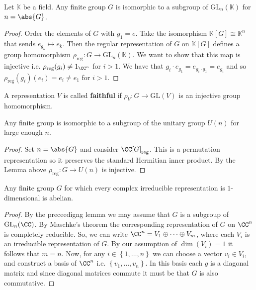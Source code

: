 \documentclass[12pt, a4paper]{article}
\newcommand{\gl}{\text{GL}}
\newcommand{\KK}{\mathbb{K}}
\begin{document}
\begin{lemma}
    Let \(\KK\) be a field. Any finite group \(G\) is isomorphic to a subgroup of \(\gl_n(\KK)\) for \(n=\abs{G}\).
\end{lemma}

\begin{proof}
    Order the elements of \(G\) with \(g_1=e\). Take the isomorphism \(\KK[G]\cong \KK^n\) that sends \(e_{g_k} \mapsto e_k\). Then the regular representation of \(G\) on \(\KK[G]\) defines a group homomorphism \(\rho_{\text{reg}}:G \to \gl_n(\KK)\). We want to show that this map is injective i.e. \(\rho_{\text{reg}}(g_i) \neq 1_{\CC^n}\) for \(i> 1\). We have that \(g_i \cdot e_{g_1}=e_{g_i\cdot g_1}=e_{g_i}\) and so \(\rho_{\text{reg}}(g_i)(e_i)=e_i\neq e_1\) for \(i >1\).
\end{proof}

\begin{definition}
    A representation \(V\) is called \textbf{faithful} if \(\rho_V :G \to \gl(V)\) is an injective group homomorphism.
\end{definition}

\begin{mdcor}
    Any finite group is isomorphic to a subgroup of the unitary group \(U(n)\) for large enough \(n\).
\end{mdcor}

\begin{proof}
    Set \(n=\abs{G}\) and consider \(\CC[G]_{\text{reg}}\). This is a permutation representation so it preserves the standard Hermitian inner product. By the Lemma above \(\rho_{\text{reg}}:G \to U(n)\) is injective.
\end{proof}

\begin{mdlemma}
    Any finite group \(G\) for which every complex irreducible representation is \(1\)-dimensional is abelian.
\end{mdlemma}

\begin{proof}
    By the preceedigng lemma we may assume that \(G\) is a subgroup of \(\gl_n(\CC)\). By Maschke's theorem the corresponding representation of \(G\) on \(\CC^n\) is completely reducible. So, we can write \(\CC^n = V_1\oplus \cdots \oplus V_m\), where each \(V_i\) is an irreducible representation of \(G\). By our assumption of \(\dim(V_i)=1\) it follows that \(m=n\). Now, for any \(i \in \left\{ 1,\ldots,n \right\}\) we can choose a vector \(v_i \in V_i\), and construct a basis of \(\CC^n\) i.e. \(\left\{ v_1,\ldots,v_n \right\}\). In this basis each \(g\) is a diagonal matrix and since diagonal matrices commute it must be that \(G\) is also commutative.
\end{proof}
\end{document}
